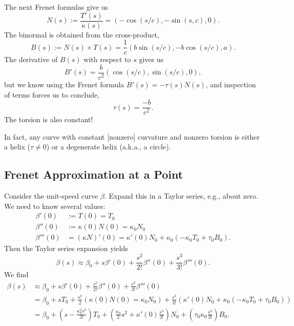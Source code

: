 \begin{example}
The next Frenet formulas give us
\begin{equation}
N(s) := \frac{T'(s)}{\kappa(s)} = (-\cos(s/c),-\sin(s,c),0).
\end{equation}
The binormal is obtained from the cross-product,
\begin{equation}
B(s) := N(s)\times T(s) = \frac{1}{c}(b\sin(s/c),-b\cos(s/c),a).
\end{equation}
The derivative of $B(s)$ with respect to $s$ gives us
\begin{equation}
B'(s) = \frac{b}{c^{2}}(\cos(s/c),\sin(s/c),0),
\end{equation}
but we know using the Frenet formula $B'(s) = -\tau(s)N(s)$, and
inspection of terms forces us to conclude,
\begin{equation}
\tau(s) = \frac{-b}{c^{2}}.
\end{equation}
The torsion is also constant!

In fact, any curve with constant [nonzero] curvature and nonzero torsion
is either a helix ($\tau\neq0$) or a degenerate helix (a.k.a., a circle).
\end{example}

\subsection{Frenet Approximation at a Point}

\M
Consider the unit-speed curve $\beta$. Expand this in a Taylor series,
e.g., about zero. We need to know several values:
\begin{subequations}
  \begin{align}
    \beta'(0) &:= T(0) = T_{0}\\
    \beta''(0) &:=\kappa(0)N(0) = \kappa_{0}N_{0}\\
    \beta'''(0) &= (\kappa N)'(0) = \kappa'(0)N_{0} + \kappa_{0}(-\kappa_{0}T_{0}+\tau_{0}B_{0}).
  \end{align}
\end{subequations}
Then the Taylor series expansion yields
\begin{equation}
  \beta(s)\approx\beta_{0} + s\beta'(0) + \frac{s^{2}}{2!}\beta''(0) + \frac{s^{3}}{3!}\beta'''(0).
\end{equation}
We find
\begin{subequations}
\begin{align}
\beta(s)&\approx\beta_{0} + s\beta'(0) + \frac{s^{2}}{2!}\beta''(0) + \frac{s^{3}}{3!}\beta'''(0)\\
&=\beta_{0} + sT_{0} + \frac{s^{2}}{2}(\kappa(0)N(0) = \kappa_{0}N_{0}) + \frac{s^{3}}{3!}(\kappa'(0)N_{0} + \kappa_{0}(-\kappa_{0}T_{0}+\tau_{0}B_{0}))\\
&=\beta_{0} +\left(s - \frac{\kappa_{0}^{2}s^{3}}{3!}\right)T_{0}
+\left(\frac{\kappa_{0}}{2}s^{2} + \kappa'(0)\frac{s^{3}}{3!}\right)N_{0}
+\left(\tau_{0}\kappa_{0}\frac{s^{3}}{3!}\right)B_{0}.
\end{align}
\end{subequations}

